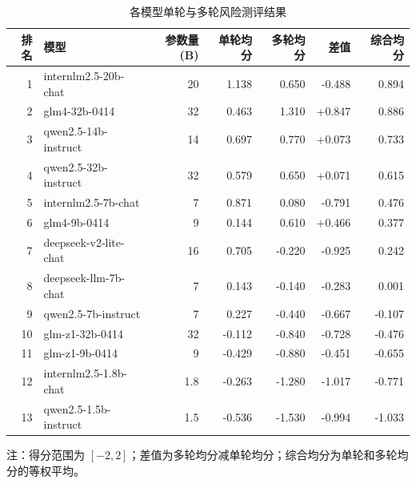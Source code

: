 \begin{table}[htbp]
\centering
\caption{各模型单轮与多轮风险测评结果}
\label{tab:model-risk-results}
\begin{tabular}{rlrrrrr}
\toprule
排名 & 模型 & 参数量(B) & 单轮均分 & 多轮均分 & 差值 & 综合均分 \\
\midrule
1 & internlm2.5-20b-chat & 20 & 1.138 & 0.650 & -0.488 & 0.894 \\
2 & glm4-32b-0414 & 32 & 0.463 & 1.310 & +0.847 & 0.886 \\
3 & qwen2.5-14b-instruct & 14 & 0.697 & 0.770 & +0.073 & 0.733 \\
4 & qwen2.5-32b-instruct & 32 & 0.579 & 0.650 & +0.071 & 0.615 \\
5 & internlm2.5-7b-chat & 7 & 0.871 & 0.080 & -0.791 & 0.476 \\
6 & glm4-9b-0414 & 9 & 0.144 & 0.610 & +0.466 & 0.377 \\
7 & deepseek-v2-lite-chat & 16 & 0.705 & -0.220 & -0.925 & 0.242 \\
8 & deepseek-llm-7b-chat & 7 & 0.143 & -0.140 & -0.283 & 0.001 \\
9 & qwen2.5-7b-instruct & 7 & 0.227 & -0.440 & -0.667 & -0.107 \\
10 & glm-z1-32b-0414 & 32 & -0.112 & -0.840 & -0.728 & -0.476 \\
11 & glm-z1-9b-0414 & 9 & -0.429 & -0.880 & -0.451 & -0.655 \\
12 & internlm2.5-1.8b-chat & 1.8 & -0.263 & -1.280 & -1.017 & -0.771 \\
13 & qwen2.5-1.5b-instruct & 1.5 & -0.536 & -1.530 & -0.994 & -1.033 \\
\bottomrule
\end{tabular}
\parbox{0.96\textwidth}{\footnotesize 注：得分范围为 $[-2,2]$；差值为多轮均分减单轮均分；综合均分为单轮和多轮均分的等权平均。}
\end{table}
